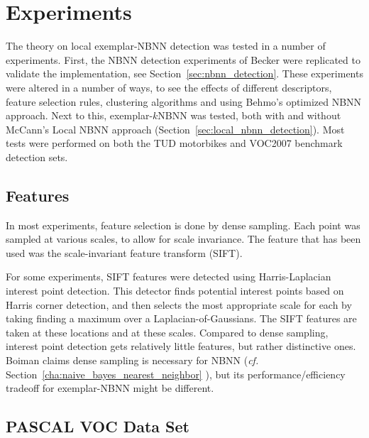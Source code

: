\section{Experiments} %
\label{cha:experimental_setup}

The theory on local exemplar-NBNN detection was tested in a number of experiments. First, the NBNN detection experiments of Becker \cite{becker2012codebook} were replicated to validate the implementation, see Section~\ref{sec:nbnn_detection}. These experiments were altered in a number of ways, to see the effects of different descriptors, feature selection rules, clustering algorithms and using Behmo's optimized NBNN approach. Next to this, exemplar-$k$NBNN was tested, both with and without McCann's Local NBNN approach (Section~\ref{sec:local_nbnn_detection}). Most tests were performed on both the TUD motorbikes and VOC2007 benchmark detection sets.

\subsection{Features} %
\label{sec:features}

In most experiments, feature selection is done by dense sampling. Each point was sampled at various scales, to allow for scale invariance. The feature that has been used was the scale-invariant feature transform (SIFT). \cite{lowe2004distinctive}

For some experiments, SIFT features were detected using Harris-Laplacian interest point detection. \cite{mikolajczyk2005comparison, vandeSande2010colorSIFT} This detector finds potential interest points based on Harris corner detection, and then selects the most appropriate scale for each by taking finding a maximum over a Laplacian-of-Gaussians. The SIFT features are taken at these locations and at these scales. Compared to dense sampling, interest point detection gets relatively little features, but rather distinctive ones. Boiman claims dense sampling is necessary for NBNN (\emph{cf.} Section~\ref{cha:naive_bayes_nearest_neighbor} \cite{boiman2008defense}), but its performance/efficiency tradeoff for exemplar-NBNN might be different.


\subsection{PASCAL VOC Data Set} %

